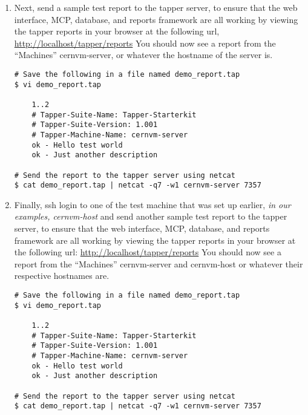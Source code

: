 \begin{enumerate}
\item Next, send a sample test report to the tapper server, to ensure that the web interface, MCP, database, and reports
framework are all working by viewing the tapper reports in your browser at the following url, 
\url{http://localhost/tapper/reports} You should now see a report from the ``Machines''
cernvm-server, or whatever the hostname of the server is.
\lstset{caption= Send a Report to Server from Server}
\begin{lstlisting}
# Save the following in a file named demo_report.tap
$ vi demo_report.tap

	1..2
	# Tapper-Suite-Name: Tapper-Starterkit
	# Tapper-Suite-Version: 1.001
	# Tapper-Machine-Name: cernvm-server
	ok - Hello test world
	ok - Just another description

# Send the report to the tapper server using netcat
$ cat demo_report.tap | netcat -q7 -w1 cernvm-server 7357
\end{lstlisting}

\item Finally, ssh login to one of the test machine that was set up earlier, \emph{in our examples, cernvm-host} and send another 
sample test report to the tapper server, to ensure that the web interface, MCP, database, and reports framework are all working by
viewing the tapper reports in your browser at the following url: \url{http://localhost/tapper/reports} 
You should now see a report from the ``Machines'' cernvm-server and cernvm-host or whatever their respective hostnames are.
\lstset{caption= Send a Report to Server from a Test Client}
\begin{lstlisting}
# Save the following in a file named demo_report.tap
$ vi demo_report.tap

	1..2
	# Tapper-Suite-Name: Tapper-Starterkit
	# Tapper-Suite-Version: 1.001
	# Tapper-Machine-Name: cernvm-server
	ok - Hello test world
	ok - Just another description

# Send the report to the tapper server using netcat
$ cat demo_report.tap | netcat -q7 -w1 cernvm-server 7357
\end{lstlisting}

\end{enumerate}
